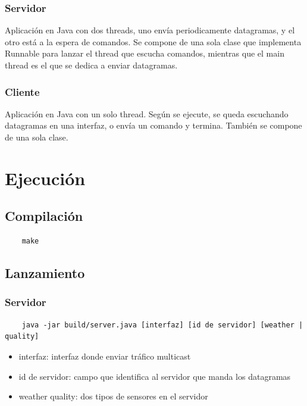 \documentclass[12pt]{article}
\begin{document}
    \subsubsection{Servidor}

    Aplicación en Java con dos threads, uno envía periodicamente datagramas,
    y el otro está a la espera de comandos. Se compone de una sola clase que implementa
    Runnable para lanzar el thread que escucha comandos, mientras que el main thread
    es el que se dedica a enviar datagramas.

    \subsubsection{Cliente}

    Aplicación en Java con un solo thread. Según se ejecute, se queda escuchando datagramas
    en una interfaz, o envía un comando y termina. También se compone de una sola clase.

    \section{Ejecución}

    \subsection{Compilación}
    
    \begin{verbatim}
    make
    \end{verbatim}
    
    \subsection{Lanzamiento}

    \subsubsection{Servidor}

    \begin{verbatim}
    java -jar build/server.java [interfaz] [id de servidor] [weather | quality]
    \end{verbatim}

    \begin{itemize}
    \item interfaz: interfaz donde enviar tráfico multicast
    \item id de servidor: campo que identifica al servidor que manda los datagramas
    \item weather \textbar quality: dos tipos de sensores en el servidor
    \end{itemize}
\end{document}
